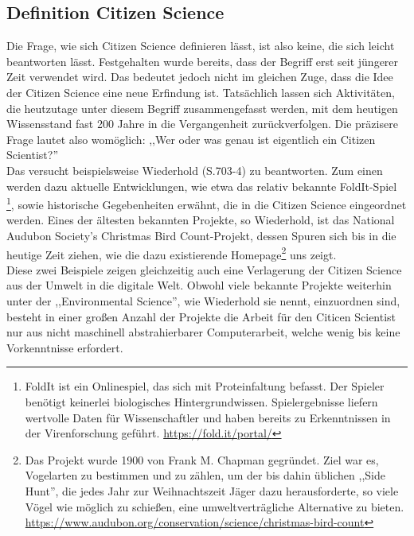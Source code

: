 \documentclass{article}
\begin{document}
\subsection{Definition Citizen Science}
Die Frage, wie sich Citizen Science definieren lässt, ist also keine, die sich leicht beantworten lässt. Festgehalten wurde bereits, dass der Begriff erst seit jüngerer Zeit verwendet wird. Das bedeutet jedoch nicht im gleichen Zuge, dass die Idee der Citizen Science eine neue Erfindung ist. Tatsächlich lassen sich Aktivitäten, die heutzutage unter diesem Begriff zusammengefasst werden, mit dem heutigen Wissensstand fast 200 Jahre in die Vergangenheit zurückverfolgen. Die präzisere Frage lautet also womöglich: ,,Wer oder was genau ist eigentlich ein Citizen Scientist?'' \\
Das versucht beispielsweise Wiederhold\cite{Wiederhold} (S.703-4) zu beantworten. Zum einen werden dazu aktuelle Entwicklungen, wie etwa das relativ bekannte FoldIt-Spiel \footnote{FoldIt ist ein Onlinespiel, das sich mit Proteinfaltung befasst. Der Spieler benötigt keinerlei biologisches Hintergrundwissen. Spielergebnisse liefern wertvolle Daten für Wissenschaftler und haben bereits zu Erkenntnissen in der Virenforschung geführt. \url{https://fold.it/portal/}}, sowie historische Gegebenheiten erwähnt, die in die Citizen Science eingeordnet werden. Eines der ältesten bekannten Projekte, so Wiederhold, ist das National Audubon Society's Christmas Bird Count-Projekt, dessen Spuren sich bis in die heutige Zeit ziehen, wie die dazu existierende Homepage\footnote{Das Projekt wurde 1900 von Frank M. Chapman gegründet. Ziel war es, Vogelarten zu bestimmen und zu zählen, um der bis dahin üblichen ,,Side Hunt'', die jedes Jahr zur Weihnachtszeit Jäger dazu herausforderte, so viele Vögel wie möglich zu schießen, eine umweltverträgliche Alternative zu bieten. \url{https://www.audubon.org/conservation/science/christmas-bird-count}} uns zeigt.\\
Diese zwei Beispiele zeigen gleichzeitig auch eine Verlagerung der Citizen Science aus der Umwelt in die digitale Welt. Obwohl viele bekannte Projekte weiterhin unter der ,,Environmental Science'', wie Wiederhold sie nennt, einzuordnen sind, besteht in einer großen Anzahl der Projekte die Arbeit für den Citicen Scientist nur aus nicht maschinell abstrahierbarer Computerarbeit, welche wenig bis keine Vorkenntnisse erfordert.\\
\end{document}
